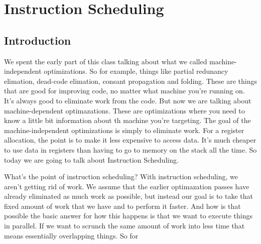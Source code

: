 \section{Instruction Scheduling}
\subsection{Introduction}
We spent the early part of this class talking about what we called
machine-independent optimizations. So for example, things like
partial redunancy elimation, dead-code elimation, consant propagation and 
folding. These are things that are good for improving code, no matter
what machine you're running on. It's always good to eliminate work
from the code. But now we are talking about machine-dependent optimazations.
These are optimizations where you need to know a little bit information
about th machine you're targeting. The goal of the machine-independent
optimizations is simply to eliminate work. For a register allocation, the point
is to make it less expensive to access data. It's much cheaper to use data in 
registers than having to go to memory on the stack all the time. So today we are going to 
talk about Instruction Scheduling. 

What's the point of instruction scheduling? With instruction scheduling, 
we aren't getting rid of work. We assume that the earlier optimazation passes have 
already eliminated as much work as possible, but instead our goal is to take that 
fixed amount of work that we have and to perform it faster. And how is that possible
the basic answer for how this happens is that we want to execute things in parallel.
If we want to scrunch the same amount of work into less time that means essentially
overlapping things. So for 